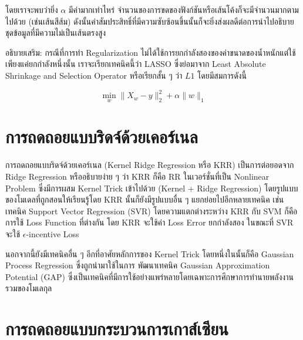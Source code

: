 \noindent โดยเราจะพบว่ายิ่ง $\alpha$ มีค่ามากเท่าไหร่ จำนวนของการขดของฟังก์ชันหรือเส้นโค้งก็จะมีจำนวนมากตามไปด้วย (เช่นเส้นสีส้ม) 
ดังนั้นค่าสัมประสิทธิ์ที่มีความซับซ้อนขึ้นนั้นก็จะยิ่งส่งผลดีต่อการนำไปอธิบายชุดข้อมูลที่มีความไม่เป็นเส้นตรงสูง

อธิบายเสริม: กรณีที่การทำ Regularization ไม่ได้ใช้การยกกำลังสองของค่าขนาดของน้ำหนักแต่ใช้เพียงแค่ยกกำลังหนึ่งนั้น เราจะเรียกเทคนิคนี้ว่า
LASSO ซึ่งย่อมาจาก Least Absolute Shrinkage and Selection Operator หรือเรียกสั้น ๆ ว่า $L1$ โดยมีสมการดังนี้

\begin{equation}
    \min_{w} \lVert X_{w} - y \rVert_{2}^{2} + \alpha \lVert w \rVert_{1}
\end{equation}

\section{การถดถอยแบบริดจ์ด้วยเคอร์เนล}
\label{sec:kernel_ridge}

การถดถอยแบบริดจ์ด้วยเคอร์เนล (Kernel Ridge Regression หรือ KRR) เป็นการต่อยอดจาก Ridge Regression หรืออธิบายง่าย ๆ ว่า 
KRR ก็คือ RR ในเวอร์ชั่นที่เป็น Nonlinear Problem ซึ่งมีการผสม Kernel Trick เข้าไปด้วย (Kernel + Ridge Regression) 
โดยรูปแบบของโมเดลที่ถูกสอนให้เรียนรู้โดย KRR นั้นก็ยังมีรูปแบบอื่น ๆ แยกย่อยไปอีกหลายเทคนิค เช่น เทคนิค Support Vector Regression 
(SVR) โดยความแตกต่างระหว่าง KRR กับ SVM ก็คือการใช้ Loss Function ที่ต่างกัน โดย KRR จะใช้ค่า Loss Error ยกกำลังสอง ในขณะที่ 
SVR จะใช้ $\epsilon$-incentive Loss

นอกจากนี้ยังมีเทคนิคอื่น ๆ อีกที่อาศัยหลักการของ Kernel Trick โดยหนึ่งในนั้นก็คือ Gaussian Process Regression ซึ่งถูกนำมาใช้ในการ%
พัฒนาเทคนิค Gaussian Approximation Potential (GAP) ซึ่งเป็นเทคนิคที่มีการใช้อย่างแพร่หลายโดยเฉพาะการศึกษาการทำนายพลังงาน%
รวมของโมเลกุล\autocite{bartok2010,bartok2015}

\section{การถดถอยแบบกระบวนการเกาส์เซียน}
\label{sec:gaussian_process}

